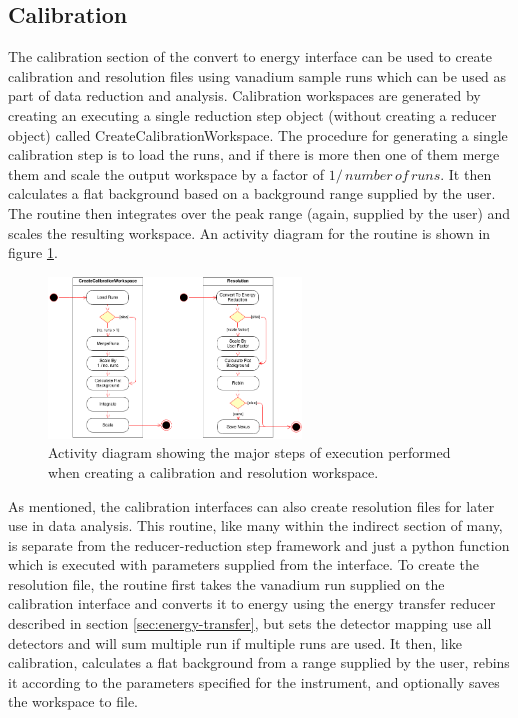 \documentclass[paper=a4, fontsize=11pt]{scrartcl}	%
\numberwithin{equation}{section}															%
\numberwithin{figure}{section}																%
\numberwithin{table}{section}																%
\begin{document}
\subsection{Calibration}
\label{subsec:c2e-calibration}
The calibration section of the convert to energy interface can be used to create calibration and resolution files using vanadium sample runs which can be used as part of data reduction and analysis. Calibration workspaces are generated by creating an executing a single reduction step object  (without creating a reducer object) called CreateCalibrationWorkspace. The procedure for generating a single calibration step is to load the runs, and if there is more then one of them merge them and scale the output workspace by a factor of $1/\,number\,of\,runs$. It then calculates a flat background based on a background range supplied by the user. The routine then integrates over the peak range (again, supplied by the user) and scales the resulting workspace. An activity diagram for the routine is shown in figure \ref{fig:c2e-calibration-activity-diagram}.

\begin{figure}[H]
\centering
\includegraphics[width=0.6\textwidth]{img/uml/activity_diagrams/Calibration_activity.png}
\caption{Activity diagram showing the major steps of execution performed when creating a calibration and resolution workspace.}
\label{fig:c2e-calibration-activity-diagram}
\end{figure}

As mentioned, the calibration interfaces can also create resolution files for later use in data analysis. This routine, like many within the indirect section of many, is separate from the reducer-reduction step  framework and just a python function which is executed with parameters supplied from the interface. To create the resolution file, the routine first takes the vanadium run supplied on the calibration interface and converts it to energy using the energy transfer reducer described in section \ref{sec:energy-transfer}, but sets the detector mapping use all detectors and will sum multiple run if multiple runs are used. It then, like calibration, calculates a flat background from a range supplied by the user, rebins it according to the parameters specified for the instrument, and optionally saves the workspace to file.
\end{document}
